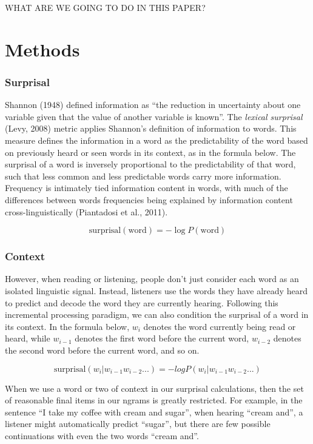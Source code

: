 \documentclass[10pt, letterpaper]{article}
\begin{document}
WHAT ARE WE GOING TO DO IN THIS PAPER?

\hypertarget{methods}{%
\section{Methods}\label{methods}}

\hypertarget{surprisal}{%
\subsubsection{Surprisal}\label{surprisal}}

Shannon (1948) defined information as ``the reduction in uncertainty
about one variable given that the value of another variable is known''.
The \emph{lexical surprisal} (Levy, 2008) metric applies Shannon's
definition of information to words. This measure defines the information
in a word as the predictability of the word based on previously heard or
seen words in its context, as in the formula below. The surprisal of a
word is inversely proportional to the predictability of that word, such
that less common and less predictable words carry more information.
Frequency is intimately tied information content in words, with much of
the differences between words frequencies being explained by information
content cross-linguistically (Piantadosi et al., 2011).

\[\text{surprisal}(\text{word}) = -\log P(\text{word})\]

\hypertarget{context}{%
\subsubsection{Context}\label{context}}

However, when reading or listening, people don't just consider each word
as an isolated linguistic signal. Instead, listeners use the words they
have already heard to predict and decode the word they are currently
hearing. Following this incremental processing paradigm, we can also
condition the surprisal of a word in its context. In the formula below,
\(w_i\) denotes the word currently being read or heard, while
\(w_{i-1}\) denotes the first word before the current word, \(w_{i-2}\)
denotes the second word before the current word, and so on.

\[\text{surprisal}(w_i|w_{i-1}w_{i-2}...) = -log P(w_i|w_{i-1}w_{i-2}...)\]

When we use a word or two of context in our surprisal calculations, then
the set of reasonable final items in our ngrams is greatly restricted.
For example, in the sentence ``I take my coffee with cream and sugar'',
when hearing ``cream and'', a listener might automatically predict
``sugar'', but there are few possible continuations with even the two
words ``cream and''.
\end{document}
